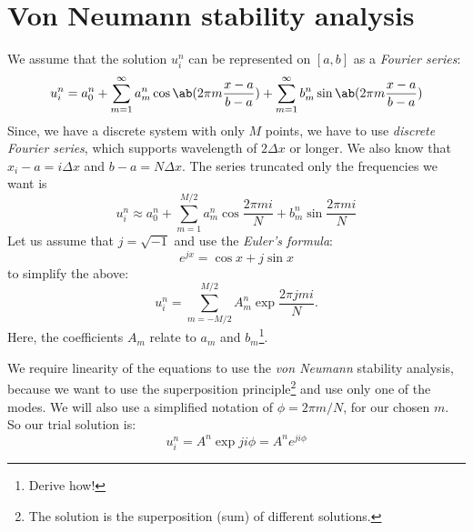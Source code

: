 \documentclass[justified, nobib,a4paper]{tufte-handout}
\begin{document}
\section{Von Neumann stability analysis}
We assume that the solution $u_i^n$ can be represented on $[a,b]$ as a \emph{Fourier series}:
\[
	u_i^n = a_0^n
	+ \sum\limits_{m=1}^\infty a_m^n \cos\ab(2\pi m \frac{x-a}{b-a})
	+ \sum\limits_{m=1}^\infty b_m^n \sin\ab(2\pi m \frac{x-a}{b-a})
\]
Since, we have a discrete system with only $M$ points, we have to use \emph{discrete Fourier series}, which supports wavelength of $2\Delta x$ or longer. We also know that $x_i - a = i\Delta x$ and $b - a = N\Delta x$. The series truncated only the frequencies we want is
\[
	u_i^n \approx a_0^n
	+ \sum\limits_{m=1}^{M/2} a_m^n \cos \frac{2\pi m i}{N}
	+  b_m^n \sin\frac{2\pi m i}{N}
\]
Let us assume that $j = \sqrt{-1}$ and use the \emph{Euler's formula}:
\[
	e^{jx} = \cos x + j \sin x
\]
to simplify the above:
\[
	u_i^n = \sum\limits_{m = -M/2}^{M/2} A_m^n \exp\frac{2\pi j m i}{N}.
\]
Here, the coefficients $A_m$ relate to $a_m$ and $b_m$\footnote{Derive how!}.

We require linearity of the equations to use the \emph{von Neumann} stability
analysis, because we want to use the superposition principle\footnote{%
	The solution is the superposition (sum) of different solutions.%
} and use only one of the modes. We will also use a simplified notation of
$\phi = 2\pi m / N$, for our chosen $m$. So our trial solution is:
\[
	u_i^n = A^n \exp ji\phi = A^n e^{ji\phi}
\]
\end{document}
